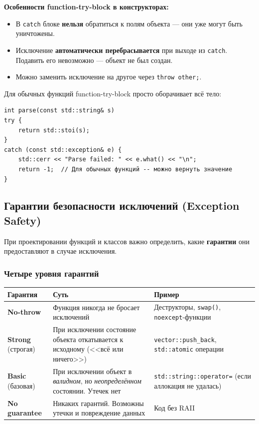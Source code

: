 \documentclass[a4paper,12pt]{article}
\begin{document}
\textbf{Особенности function-try-block в конструкторах:}
\begin{itemize}
    \item В \texttt{catch} блоке \textbf{нельзя} обратиться к полям объекта ---
          они уже могут быть уничтожены.
    \item Исключение \textbf{автоматически перебрасывается} при выходе из
          \texttt{catch}. Подавить его невозможно --- объект не был создан.
    \item Можно заменить исключение на другое через \texttt{throw other;}.
\end{itemize}

Для обычных функций function-try-block просто оборачивает всё тело:

\begin{lstlisting}
int parse(const std::string& s)
try {
    return std::stoi(s);
}
catch (const std::exception& e) {
    std::cerr << "Parse failed: " << e.what() << "\n";
    return -1;  // Для обычных функций -- можно вернуть значение
}
\end{lstlisting}

\subsection{Гарантии безопасности исключений (Exception Safety)}

При проектировании функций и классов важно определить, какие \textbf{гарантии}
они предоставляют в случае исключения.

\subsubsection{Четыре уровня гарантий}

\begin{center}
\begin{tabular}{lp{4cm}p{5cm}}
\toprule
\textbf{Гарантия} & \textbf{Суть} & \textbf{Пример} \\
\midrule
\textbf{No-throw}
    & Функция никогда не бросает исключений
    & Деструкторы, \texttt{swap()}, \texttt{noexcept}-функции \\
\addlinespace
\textbf{Strong} (строгая)
    & При исключении состояние объекта откатывается к исходному (<<всё или ничего>>)
    & \texttt{vector::push\_back}, \texttt{std::atomic} операции \\
\addlinespace
\textbf{Basic} (базовая)
    & При исключении объект в \textit{валидном}, но \textit{неопределённом} состоянии. Утечек нет
    & \texttt{std::string::operator=} (если аллокация не удалась) \\
\addlinespace
\textbf{No guarantee}
    & Никаких гарантий. Возможны утечки и повреждение данных
    & Код без RAII \\
\bottomrule
\end{tabular}
\end{center}
\end{document}
